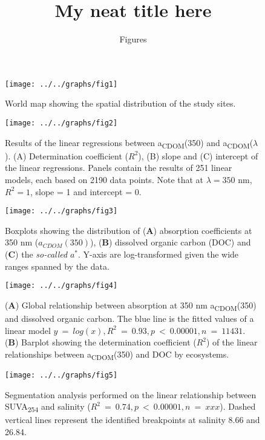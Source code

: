 \documentclass[10pt,a4paper]{scrartcl}
\title{My neat title here}
\subtitle{Figures}
\date{}
\begin{document}
\maketitle

\begin{figure}[h]
	\centering
	\texttt{[image: ../../graphs/fig1]}
	\caption{World map showing the spatial distribution of the study sites.}
\end{figure}

\clearpage
\newpage

\begin{figure}[h]
	\centering
	\texttt{[image: ../../graphs/fig2]}
	\caption{Results of the linear regressions between a\textsubscript{CDOM}(350) and a\textsubscript{CDOM}($\lambda$). (A) Determination coefficient ($R^2$), (B) slope and (C) intercept of the linear regressions. Panels contain the results of 251 linear models, each based on 2190 data points. Note that at $\lambda = 350$ nm, $R^2 = 1$, slope = 1 and intercept = 0.}
\end{figure}

\clearpage
\newpage

\begin{figure}[h]
	\centering
	\texttt{[image: ../../graphs/fig3]}
	\caption{Boxplots showing the distribution of (\textbf{A}) absorption coefficients at 350 nm ($a_{CDOM}(350)$), (\textbf{B}) dissolved organic carbon (DOC) and (\textbf{C}) the \textit{so-called} $a^*$. Y-axis are log-transformed given the wide ranges spanned by the data.}
\end{figure}

\clearpage
\newpage

\begin{figure}[h]
	\centering
	\texttt{[image: ../../graphs/fig4]}
	\caption{(\textbf{A}) Global relationship between absorption at 350 nm a\textsubscript{CDOM}(350) and dissolved organic carbon. The blue line is the fitted values of a linear model $y~=~log(x), R^2~=~0.93, p~<~0.00001, n~=~11431$. (\textbf{B}) Barplot showing the determination coefficient ($R^2$) of the linear relationships between a\textsubscript{CDOM}(350) and DOC by ecosystems.}
\end{figure}

\clearpage
\newpage

\begin{figure}[h]
	\centering
	\texttt{[image: ../../graphs/fig5]}
	\caption{Segmentation analysis performed on the linear relationship between SUVA\textsubscript{254} and salinity ($R^2~=~0.74, p~<~0.00001, n~=~xxx$). Dashed vertical lines represent the identified breakpoints at salinity 8.66 and 26.84.}
\end{figure}
\end{document}
